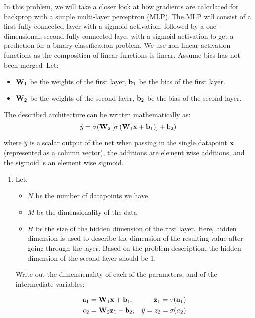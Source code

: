 \documentclass[submit]{harvardml}
\begin{document}
\begin{problem}

In this problem, we will take a closer look at how gradients are calculated for backprop with a simple multi-layer perceptron (MLP). The MLP will consist of a first fully connected layer with a sigmoid activation, followed by a one-dimensional, second fully connected layer with a sigmoid activation to get a prediction for a binary classification problem. We use non-linear activation functions as the composition of linear functions is linear. Assume bias has not been merged. Let:
\begin{itemize}
  \item $\bold{W}_1$ be the weights of the first layer, $\bold{b}_1$ be the bias of the first layer.
  \item $\bold{W}_2$ be the weights of the second layer, $\bold{b}_2$ be the bias of the second layer.
\end{itemize}

The described architecture can be written mathematically as: $$\hat{y} = \sigma(\bold{W}_2 \left[\sigma \left(\bold{W}_1 \bold{x} + \bold{b}_1\right)\right] + \bold{b}_2)$$

where $\hat{y}$ is a scalar output of the net when passing in the single datapoint $\bold{x}$ (represented as a column vector), the additions are element wise additions, and the sigmoid is an element wise sigmoid.

\begin{enumerate}
  \item Let:
        \begin{itemize}
          \item $N$ be the number of datapoints we have
          \item $M$ be the dimensionality of the data
          \item $H$ be the size of the hidden dimension of the first layer. Here, hidden dimension is used to describe the dimension of the resulting value after going through the layer. Based on the problem description, the hidden dimension of the second layer should be 1.
        \end{itemize}

        Write out the dimensionality of each of the parameters, and of the intermediate variables:

        \begin{align*}
          \bold{a}_1 & = \bold{W}_1 \bold{x} + \bold{b}_1,
                     & \bold{z}_1 = \sigma(\bold{a}_1)       \\
          a_2        & = \bold{W}_2 \bold{z}_1 + \bold{b}_2,
                     & \hat{y} = z_2 = \sigma(a_2)
        \end{align*}


\end{enumerate}
\end{problem}
\end{document}
